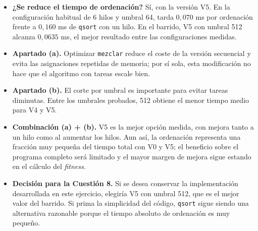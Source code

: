 \documentclass[12pt]{article}
\begin{document}
\begin{enumerate}
\begin{itemize}
    \item \textbf{¿Se reduce el tiempo de ordenación?} Sí, con la versión V5. En la configuración habitual de 6 hilos y umbral 64, tarda $0,070$ ms por ordenación frente a $0,160$ ms de \texttt{qsort} con un hilo. En el barrido, V5 con umbral 512 alcanza $0,0635$ ms, el mejor resultado entre las configuraciones medidas.
    \item \textbf{Apartado (a).} Optimizar \texttt{mezclar} reduce el coste de la versión secuencial y evita las asignaciones repetidas de memoria; por sí sola, esta modificación no hace que el algoritmo con tareas escale bien.
    \item \textbf{Apartado (b).} El corte por umbral es importante para evitar tareas diminutas. Entre los umbrales probados, 512 obtiene el menor tiempo medio para V4 y V5.
    \item \textbf{Combinación (a) + (b).} V5 es la mejor opción medida, con mejora tanto a un hilo como al aumentar los hilos. Aun así, la ordenación representa una fracción muy pequeña del tiempo total con V0 y V5; el beneficio sobre el programa completo será limitado y el mayor margen de mejora sigue estando en el cálculo del \textit{fitness}.
    \item \textbf{Decisión para la Cuestión 8.} Si se desea conservar la implementación desarrollada en este ejercicio, elegiría V5 con umbral 512, que es el mejor valor del barrido. Si prima la simplicidad del código, \texttt{qsort} sigue siendo una alternativa razonable porque el tiempo absoluto de ordenación es muy pequeño.
\end{itemize}



































































\end{enumerate}
\end{document}
